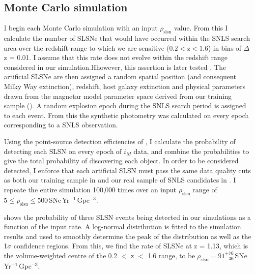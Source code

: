 \subsection{Monte Carlo simulation}
\label{sec:rate-calculation}
I begin each Monte Carlo simulation with an input $\rho_{\mathrm{slsn}}$ value. From this I calculate the number of SLSNe that would have occurred within the SNLS search area over the redshift range to which we are sensitive ($0.2<\mathrm{z}<1.6$) in bins of $\Delta$z = 0.01. I assume that this rate does not evolve within the redshift range considered in our simulation.Hhowever, this assertion is later tested . The artificial SLSNe are then assigned a random spatial position (and consequent Milky Way extinction), redshift, host galaxy extinction and physical parameters drawn from the magnetar model parameter space derived from our training sample (). A random explosion epoch during the SNLS search period is assigned to each event. From this the synthetic photometry was calculated on every epoch corresponding to a SNLS observation.

Using the point-source detection efficiencies of \cite{Perrett2010}, I calculate the probability of detecting each SLSN on every epoch of $i_M$ data, and combine the probabilities to give the total probability of discovering each object. In order to be considered detected, I enforce that each artificial SLSN must pass the same data quality cuts as both our training sample in  and our real sample of SNLS candidates in . I repeate the entire simulation 100,000 times over an input $\rho_{\mathrm{slsn}}$ range of $5 \leq \rho_{\mathrm{slsn}} \leq 500$\,SNe\,Yr$^{-1}$\,Gpc$^{-3}$.

 shows the probability of three SLSN events being detected in our simulations as a function of the input rate. A log-normal distribution is fitted to the simulation results and used to smoothly determine the peak of the distribution as well as the 1$\sigma$ confidence regions. From this, we find the rate of SLSNe at z = 1.13, which is the volume-weighted centre of the 0.2 $<$ z $<$ 1.6 range, to be $\rho_{\mathrm{slsn}} = 91^{+76}_{-36}$\,SNe\,Yr$^{-1}$\,Gpc$^{-3}$.

